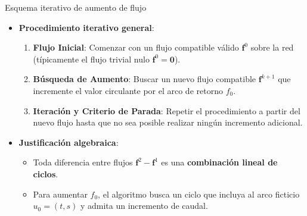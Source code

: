 \documentclass[
  ignorenonframetext,
]{beamer}
\providecommand{\tightlist}{%
  \setlength{\itemsep}{0pt}\setlength{\parskip}{0pt}}
\begin{document}
\begin{frame}{Esquema iterativo de aumento de flujo}
\label{esquema-iterativo-de-aumento-de-flujo}
\begin{itemize}
\tightlist
\item
  \textbf{Procedimiento iterativo general}:

  \begin{enumerate}
  \tightlist
  \item
    \textbf{Flujo Inicial}: Comenzar con un flujo compatible válido
    \(\mathbf{f}^0\) sobre la red (típicamente el flujo trivial nulo
    \(\mathbf{f}^0 = \mathbf{0}\)).
  \item
    \textbf{Búsqueda de Aumento}: Buscar un nuevo flujo compatible
    \(\mathbf{f}^{k+1}\) que incremente el valor circulante por el arco
    de retorno \(f_0\).
  \item
    \textbf{Iteración y Criterio de Parada}: Repetir el procedimiento a
    partir del nuevo flujo hasta que no sea posible realizar ningún
    incremento adicional.
  \end{enumerate}
\item
  \textbf{Justificación algebraica}:

  \begin{itemize}
  \tightlist
  \item
    Toda diferencia entre flujos \(\mathbf{f}^2 - \mathbf{f}^1\) es una
    \textbf{combinación lineal de ciclos}.
  \item
    Para aumentar \(f_0\), el algoritmo busca un ciclo que incluya al
    arco ficticio \(u_0 = (t, s)\) y admita un incremento de caudal.
  \end{itemize}
\end{itemize}
\end{frame}
\end{document}
